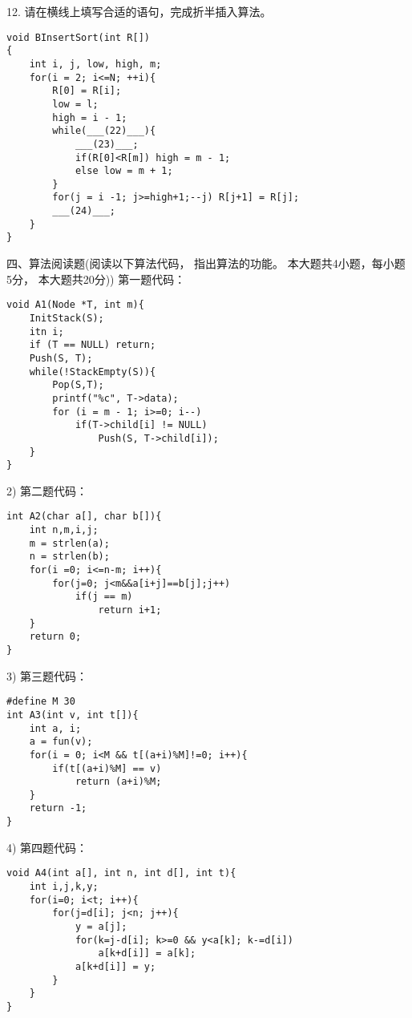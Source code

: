 12. 请在横线上填写合适的语句，完成折半插入算法。\newline

\begin{lstlisting}[basicstyle=\small\ttfamily, caption={}, numbers=none]
void BInsertSort(int R[])
{
	int i, j, low, high, m;
	for(i = 2; i<=N; ++i){
		R[0] = R[i];
		low = l;
		high = i - 1;
		while(___(22)___){
			___(23)___;
			if(R[0]<R[m]) high = m - 1;
			else low = m + 1;
		}
		for(j = i -1; j>=high+1;--j) R[j+1] = R[j];
		___(24)___;
	}
}
\end{lstlisting}

四、算法阅读题(阅读以下算法代码， 指出算法的功能。 本大题共4小题，每小题5分， 本大题共20分)) 第一题代码：\newline
\begin{lstlisting}[basicstyle=\small\ttfamily, caption={}, numbers=none]
void A1(Node *T, int m){
	InitStack(S);
	itn i;
	if (T == NULL) return;
	Push(S, T);
	while(!StackEmpty(S)){
		Pop(S,T);
		printf("%c", T->data);
		for (i = m - 1; i>=0; i--)
			if(T->child[i] != NULL)
				Push(S, T->child[i]);
	}
}
\end{lstlisting}

2) 第二题代码：\newline
\begin{lstlisting}[basicstyle=\small\ttfamily, caption={}, numbers=none]
int A2(char a[], char b[]){
	int n,m,i,j;
	m = strlen(a);
	n = strlen(b);
	for(i =0; i<=n-m; i++){
		for(j=0; j<m&&a[i+j]==b[j];j++)
			if(j == m)
				return i+1;
	}
	return 0;
}
\end{lstlisting}

3) 第三题代码：\newline
\begin{lstlisting}[basicstyle=\small\ttfamily, caption={}, numbers=none]
#define M 30
int A3(int v, int t[]){
	int a, i;
	a = fun(v);
	for(i = 0; i<M && t[(a+i)%M]!=0; i++){
		if(t[(a+i)%M] == v)
			return (a+i)%M;
	}
	return -1;
}
\end{lstlisting}
4) 第四题代码：\newline
\begin{lstlisting}[basicstyle=\small\ttfamily, caption={}, numbers=none]
void A4(int a[], int n, int d[], int t){
	int i,j,k,y;
	for(i=0; i<t; i++){
		for(j=d[i]; j<n; j++){
			y = a[j];
			for(k=j-d[i]; k>=0 && y<a[k]; k-=d[i])
				a[k+d[i]] = a[k];
			a[k+d[i]] = y;
		}
	}
}

\end{lstlisting}

